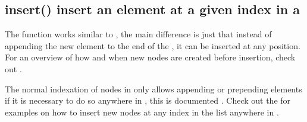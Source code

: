 \documentclass[a4paper,10pt,english]{sphinxmanual}
\begin{document}
\subsection{insert() \textendash{} insert an element at a given index in a }
\label{\detokenize{README:insert-insert-an-element-at-a-given-index-in-a-list}}
\sphinxAtStartPar
The  function works similar to {\hyperref[\detokenize{README:append-adding-a-new-element-to-a-list}]{}}, the main difference is just that instead of appending the new element to the end of the , it can be inserted at any position. For an overview of how and when new \sphinxhyphen{}nodes are created before insertion, check out {\hyperref[\detokenize{README:append-adding-a-new-element-to-a-list}]{}}.

\begin{sphinxVerbatim}[commandchars=\\\{\},numbers=left,firstnumber=1,stepnumber=1]
   \PYG{p}{[}  \PYG{p}{]}
    
\end{sphinxVerbatim}

\sphinxAtStartPar
The normal indexation of \sphinxhyphen{}nodes in  only allows appending or prepending elements if it is necessary to do so anywhere in {\hyperref[\detokenize{README:the-path-parameter}]{}}, this is documented {\hyperref[\detokenize{README:correctly-handling-list-indices}]{}}. Check out the {\hyperref[\detokenize{README:list-insert}]{}}  for examples on how to insert new nodes at any index in the list anywhere in .
\end{document}

